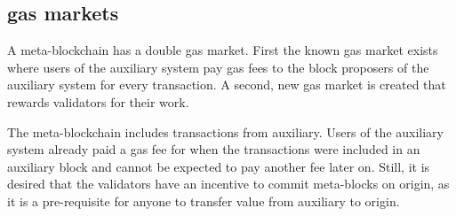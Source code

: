 \documentclass[12pt,a4paper]{article}
\begin{document}

%




\subsection{gas markets}

A meta-blockchain has a double gas market.
First the known gas market exists where users of the auxiliary system pay gas fees to the block proposers of the auxiliary system for every transaction.
A second, new gas market is created that rewards validators for their work.

The meta-blockchain includes transactions from auxiliary.
Users of the auxiliary system already paid a gas fee for when the transactions were included in an auxiliary block and cannot be expected to pay another fee later on.
Still, it is desired that the validators have an incentive to commit meta-blocks on origin, as it is a pre-requisite for anyone to transfer value from auxiliary to origin.
\end{document}
